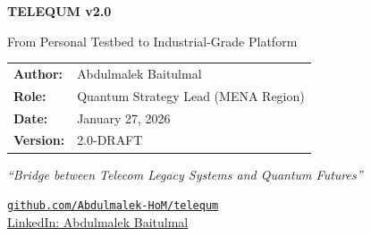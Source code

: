 \documentclass[11pt,a4paper]{article}
\begin{document}
\begin{titlepage}
    \centering
    \vspace*{2cm}
    
    {\Huge\bfseries\textcolor{ericssonblue}{TELEQUM v2.0}\par}
    \vspace{0.5cm}
    {\LARGE\textcolor{quantumpurple}{From Personal Testbed to Industrial-Grade Platform}\par}
    
    \vspace{1.5cm}
    
    
    \vspace{2cm}
    
    \begin{tabular}{ll}
        \textbf{Author:} & Abdulmalek Baitulmal \\
        \textbf{Role:} & Quantum Strategy Lead (MENA Region) \\
        \textbf{Date:} & January 27, 2026 \\
        \textbf{Version:} & 2.0-DRAFT \\
    \end{tabular}
    
    \vspace{1cm}
    
    \begin{minipage}{0.8\textwidth}
        \centering
        \textit{``Bridge between Telecom Legacy Systems and Quantum Futures''}
    \end{minipage}
    
    \vfill
    
    \href{https://github.com/Abdulmalek-HoM/telequm}{\texttt{github.com/Abdulmalek-HoM/telequm}}\\[5pt]
    \href{https://www.linkedin.com/in/abdulmalek-baitulmal-543753140/}{LinkedIn: Abdulmalek Baitulmal}
    
\end{titlepage}
\end{document}
